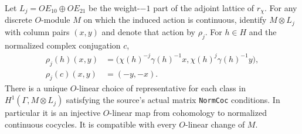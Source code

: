 \begin{lemma}
\label{AC-G52-normalization}
Let $L_j=O E_{10}\oplus O E_{21}$ be the weight-$-1$
part of the adjoint lattice of $r_\chi$.
For any discrete $O$-module $M$ on which the induced
action is continuous, identify $M\otimes L_j$ with
column pairs $(x,y)$ and denote that action by $\rho_j$.
For $h\in H$ and the normalized complex conjugation $c$,
\[
 \begin{split}
 \rho_j(h)(x,y)
    &=\bigl(\chi(h)^{-j}\gamma(h)^{-1}x,
             \chi(h)^j\gamma(h)^{-1}y\bigr),\\
 \rho_j(c)(x,y)&=(-y,-x).
 \end{split}                                                   \tag{G52.3}
\]
There is a unique $O$-linear choice of representative
for each class in $H^1(\Gamma,M\otimes L_j)$ satisfying
the source's actual matrix \texttt{NormCoc} conditions.
In particular it is an injective $O$-linear map from
cohomology to normalized continuous cocycles.
It is compatible with every $O$-linear change of $M$.
\end{lemma}
